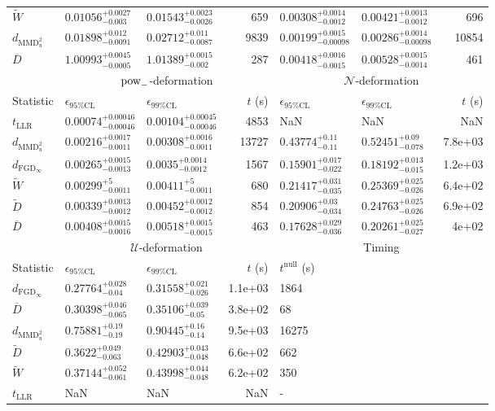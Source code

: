 \begin{tabular}{l|llr|llr}
	$\widetilde{W}$ & $0.01056_{-0.003}^{+0.0027}$ & $0.01543_{-0.0026}^{+0.0023}$ & 659 & $0.00308_{-0.0012}^{+0.0014}$ & $0.00421_{-0.0012}^{+0.0013}$ & 696 \\
	$d_{\mathrm{MMD}^{2}_{u}}$ & $0.01898_{-0.0091}^{+0.012}$ & $0.02712_{-0.0087}^{+0.011}$ & 9839 & $0.00199_{-0.00098}^{+0.0015}$ & $0.00286_{-0.00098}^{+0.0014}$ & 10854 \\
	$\overline{D}$ & $1.00993_{-0.0005}^{+0.0045}$ & $1.01389_{-0.002}^{+0.0015}$ & 287 & $0.00418_{-0.0015}^{+0.0016}$ & $0.00528_{-0.0014}^{+0.0015}$ & 461 \\
	\toprule
	\multicolumn{1}{c}{} & \multicolumn{3}{c}{$\rm{pow}_{-}$-deformation} & \multicolumn{3}{c}{$\mathcal{N}$-deformation} \\
	Statistic & $\epsilon_{95\%\mathrm{CL}}$ & $\epsilon_{99\%\mathrm{CL}}$ & $t$ (s) & $\epsilon_{95\%\mathrm{CL}}$ & $\epsilon_{99\%\mathrm{CL}}$ & $t$ (s) \\
	\midrule
	$t_{\mathrm{LLR}}$ & $0.00074_{-0.00046}^{+0.00046}$ & $0.00104_{-0.00046}^{+0.00045}$ & 4853 & NaN & NaN & NaN \\
	$d_{\mathrm{MMD}^{2}_{u}}$ & $0.00216_{-0.0011}^{+0.0017}$ & $0.00308_{-0.0011}^{+0.0016}$ & 13727 & $0.43774_{-0.11}^{+0.11}$ & $0.52451_{-0.078}^{+0.09}$ & 7.8e+03 \\
	$d_{\mathrm{FGD}_{\infty}}$ & $0.00265_{-0.0013}^{+0.0015}$ & $0.0035_{-0.0012}^{+0.0014}$ & 1567 & $0.15901_{-0.022}^{+0.017}$ & $0.18192_{-0.015}^{+0.013}$ & 1.2e+03 \\
	$\widetilde{W}$ & $0.00299_{-0.0011}^{+5}$ & $0.00411_{-0.0011}^{+5}$ & 680 & $0.21417_{-0.035}^{+0.031}$ & $0.25369_{-0.026}^{+0.025}$ & 6.4e+02 \\
	$\widetilde{D}$ & $0.00339_{-0.0012}^{+0.0013}$ & $0.00452_{-0.0012}^{+0.0012}$ & 854 & $0.20906_{-0.034}^{+0.03}$ & $0.24763_{-0.026}^{+0.025}$ & 6.9e+02 \\
	$\overline{D}$ & $0.00408_{-0.0016}^{+0.0015}$ & $0.00518_{-0.0015}^{+0.0015}$ & 463 & $0.17628_{-0.036}^{+0.029}$ & $0.20261_{-0.027}^{+0.025}$ & 4e+02 \\
	\toprule
	\multicolumn{1}{c}{} & \multicolumn{3}{c}{$\mathcal{U}$-deformation} & \multicolumn{3}{c}{Timing} \\
	Statistic & $\epsilon_{95\%\mathrm{CL}}$ & $\epsilon_{99\%\mathrm{CL}}$ & $t$ (s) & $t^{\mathrm{null}}$ (s) \\
	\midrule
	$d_{\mathrm{FGD}_{\infty}}$ & $0.27764_{-0.04}^{+0.028}$ & $0.31558_{-0.026}^{+0.021}$ & 1.1e+03 & 1864 \\
	$\overline{D}$ & $0.30398_{-0.065}^{+0.046}$ & $0.35106_{-0.05}^{+0.039}$ & 3.8e+02 & 68 \\
	$d_{\mathrm{MMD}^{2}_{u}}$ & $0.75881_{-0.19}^{+0.19}$ & $0.90445_{-0.14}^{+0.16}$ & 9.5e+03 & 16275 \\
	$\widetilde{D}$ & $0.3622_{-0.063}^{+0.049}$ & $0.42903_{-0.048}^{+0.043}$ & 6.6e+02 & 662 \\
	$\widetilde{W}$ & $0.37144_{-0.061}^{+0.052}$ & $0.43998_{-0.048}^{+0.044}$ & 6.2e+02 & 350 \\
	$t_{\mathrm{LLR}}$ & NaN & NaN & NaN & - \\
	\bottomrule
\end{tabular}
